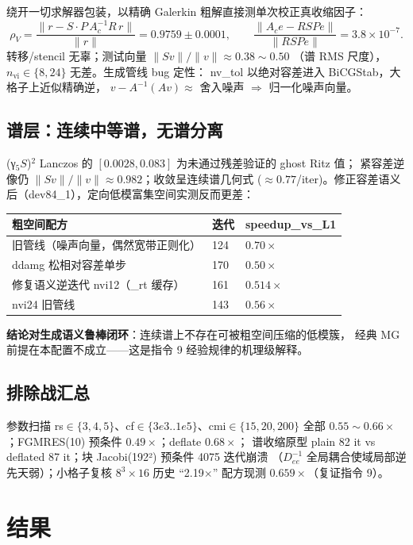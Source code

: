\documentclass[UTF8]{ctexart}
\begin{document}
绕开一切求解器包装，以精确 Galerkin 粗解直接测单次校正真收缩因子：
\[
\rho_V=\frac{\lVert r-S\cdot P\,A_c^{-1}R\,r\rVert}{\lVert r\rVert}=0.9759\pm0.0001,
\qquad
\frac{\lVert A_c e-RSPe\rVert}{\lVert RSPe\rVert}=3.8\times10^{-7}.
\]
转移/stencil 无辜；测试向量 $\lVert Sv\rVert/\lVert v\rVert\approx0.38\sim0.50$
（谱 RMS 尺度），$n_{\text{vi}}\in\{8,24\}$ 无差。生成管线 bug 定性：
nv\_tol 以绝对容差进入 BiCGStab，大格子上近似精确逆，
$v-A^{-1}(Av)\approx$ 舍入噪声 $\Rightarrow$ 归一化噪声向量。

\subsection{谱层：连续中等谱，无谱分离}

(γ$_5S$)$^2$ Lanczos 的 $[0.0028,0.083]$ 为未通过残差验证的 ghost Ritz 值；
紧容差逆像仍 $\lVert Sv\rVert/\lVert v\rVert\approx0.982$；收敛呈连续谱几何式
($\approx0.77$/iter)。修正容差语义后（dev84\_1），定向低模富集空间实测反而更差：

\begin{xltabular}{\linewidth}{@{}lXX@{}}
\toprule
粗空间配方 & 迭代 & speedup\_vs\_L1 \\
\midrule
旧管线（噪声向量，偶然宽带正则化） & 124 & $0.70\times$ \\
ddamg 松相对容差单步 & 170 & $0.50\times$ \\
修复语义逆迭代 nvi12（\_rt 缓存） & 161 & $0.514\times$ \\
nvi24 旧管线 & 143 & $0.56\times$ \\
\bottomrule
\end{xltabular}

\textbf{结论对生成语义鲁棒闭环}：连续谱上不存在可被粗空间压缩的低模簇，
经典 MG 前提在本配置不成立——这是指令 9 经验规律的机理级解释。

\subsection{排除战汇总}

参数扫描 rs$\in\{3,4,5\}$、cf$\in\{3e3..1e5\}$、cmi$\in\{15,20,200\}$ 全部
$0.55\sim0.66\times$；FGMRES(10) 预条件 $0.49\times$；deflate $0.68\times$；
谱收缩原型 plain 82 it vs deflated 87 it；块 Jacobi(192²) 预条件 4075 迭代崩溃
（$D_{ee}^{-1}$ 全局耦合使域局部逆先天弱）；小格子复核 $8^3\times16$ 历史
``2.19$\times$'' 配方现测 $0.659\times$（复证指令 9）。

\section{结果}
\end{document}
